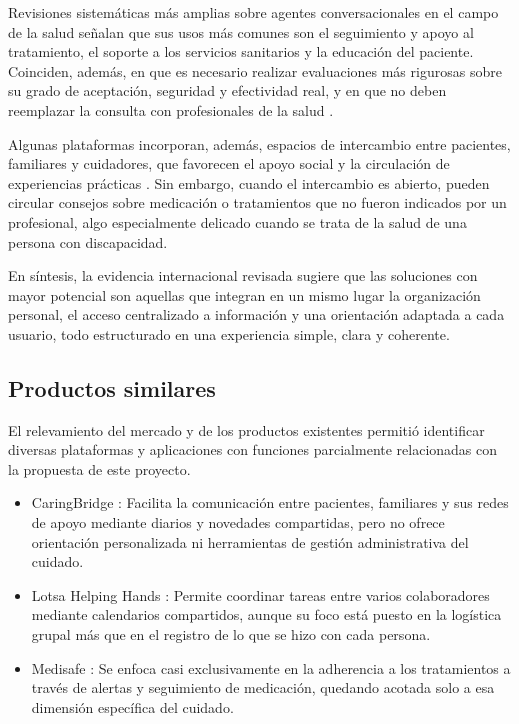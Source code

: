 Revisiones sistemáticas más amplias sobre agentes conversacionales en el campo de la salud señalan que sus usos más comunes son el seguimiento y apoyo al tratamiento, el soporte a los servicios sanitarios y la educación del paciente. Coinciden, además, en que es necesario realizar evaluaciones más rigurosas sobre su grado de aceptación, seguridad y efectividad real, y en que no deben reemplazar la consulta con profesionales de la salud \citep{milneives2020,binsawad2022}.

Algunas plataformas incorporan, además, espacios de intercambio entre pacientes, familiares y cuidadores, que favorecen el apoyo social y la circulación de experiencias prácticas \citep{caringbridge}. Sin embargo, cuando el intercambio es abierto, pueden circular consejos sobre medicación o tratamientos que no fueron indicados por un profesional, algo especialmente delicado cuando se trata de la salud de una persona con discapacidad.

En síntesis, la evidencia internacional revisada sugiere que las soluciones con mayor potencial son aquellas que integran en un mismo lugar la organización personal, el acceso centralizado a información y una orientación adaptada a cada usuario, todo estructurado en una experiencia simple, clara y coherente.

\subsection{Productos similares}\label{sec:productos-similares}

El relevamiento del mercado y de los productos existentes permitió identificar diversas plataformas y aplicaciones con funciones parcialmente relacionadas con la propuesta de este proyecto.

\begin{itemize}
    \item CaringBridge \citep{caringbridge}: Facilita la comunicación entre pacientes, familiares y sus redes de apoyo mediante diarios y novedades compartidas, pero no ofrece orientación personalizada ni herramientas de gestión administrativa del cuidado.
    \item Lotsa Helping Hands \citep{lotsa}: Permite coordinar tareas entre varios colaboradores mediante calendarios compartidos, aunque su foco está puesto en la logística grupal más que en el registro de lo que se hizo con cada persona.
    \item Medisafe \citep{medisafe2026}: Se enfoca casi exclusivamente en la adherencia a los tratamientos a través de alertas y seguimiento de medicación, quedando acotada solo a esa dimensión específica del cuidado.
\end{itemize}

